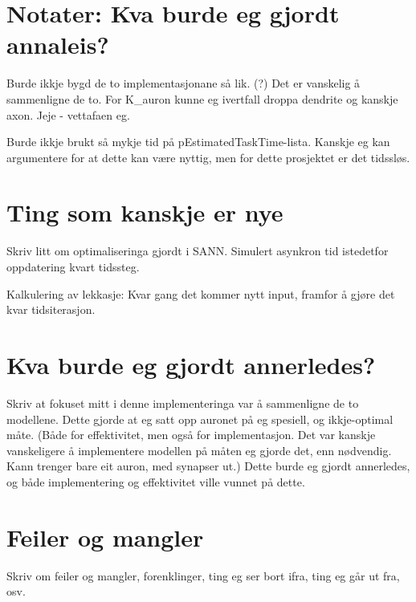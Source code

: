 \section{Notater: Kva burde eg gjordt annaleis?}
Burde ikkje bygd de to implementasjonane så lik. (?)
Det er vanskelig å sammenligne de to. For K\_auron kunne eg ivertfall droppa dendrite og kanskje axon.
Jeje - vettafaen eg.

Burde ikkje brukt så mykje tid på pEstimatedTaskTime-lista. Kanskje eg kan argumentere for at dette kan være nyttig, men for dette prosjektet er det tidssløs.


\section{Ting som kanskje er nye}
Skriv litt om optimaliseringa gjordt i SANN. Simulert asynkron tid istedetfor oppdatering kvart tidssteg.

Kalkulering av lekkasje: Kvar gang det kommer nytt input, framfor å gjøre det kvar tidsiterasjon.

\section{Kva burde eg gjordt annerledes?}
Skriv at fokuset mitt i denne implementeringa var å sammenligne de to modellene. Dette gjorde at eg satt opp auronet på eg spesiell, og ikkje-optimal måte.
(Både for effektivitet, men også for implementasjon. Det var kanskje vanskeligere å implementere modellen på måten eg gjorde det, enn nødvendig. Kann trenger bare eit auron, med synapser ut.)
Dette burde eg gjordt annerledes, og både implementering og effektivitet ville vunnet på dette.


\section{Feiler og mangler}
Skriv om feiler og mangler, forenklinger, ting eg ser bort ifra, ting eg går ut fra, osv.

%
%

